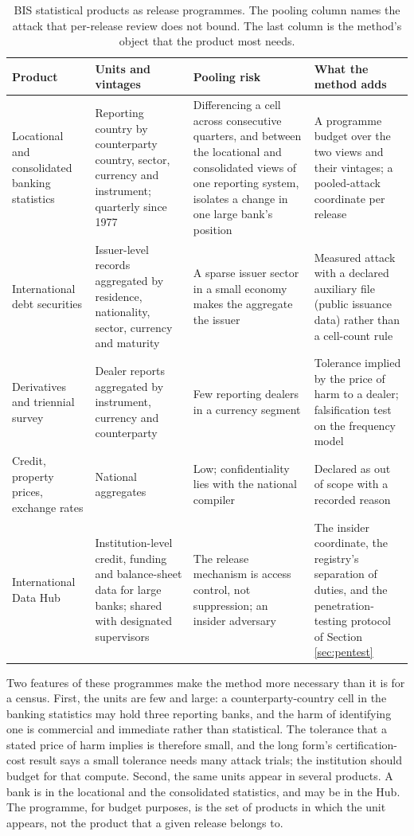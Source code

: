 \documentclass[11pt,a4paper]{article}
\begin{document}
\begin{table}[htbp]
\centering\small
\caption{BIS statistical products as release programmes. The pooling column names the attack that per-release review does not bound. The last column is the method's object that the product most needs.}
\label{tab:programmes}
\begin{tabular}{p{30mm}p{34mm}p{40mm}p{34mm}}
\toprule
Product & Units and vintages & Pooling risk & What the method adds \\
\midrule
Locational and consolidated banking statistics & Reporting country by counterparty country, sector, currency and instrument; quarterly since 1977 & Differencing a cell across consecutive quarters, and between the locational and consolidated views of one reporting system, isolates a change in one large bank's position & A programme budget over the two views and their vintages; a pooled-attack coordinate per release \\
International debt securities & Issuer-level records aggregated by residence, nationality, sector, currency and maturity & A sparse issuer sector in a small economy makes the aggregate the issuer & Measured attack with a declared auxiliary file (public issuance data) rather than a cell-count rule \\
Derivatives and triennial survey & Dealer reports aggregated by instrument, currency and counterparty & Few reporting dealers in a currency segment & Tolerance implied by the price of harm to a dealer; falsification test on the frequency model \\
Credit, property prices, exchange rates & National aggregates & Low; confidentiality lies with the national compiler & Declared as out of scope with a recorded reason \\
International Data Hub & Institution-level credit, funding and balance-sheet data for large banks; shared with designated supervisors & The release mechanism is access control, not suppression; an insider adversary & The insider coordinate, the registry's separation of duties, and the penetration-testing protocol of Section \ref{sec:pentest} \\
\bottomrule
\end{tabular}
\end{table}

Two features of these programmes make the method more necessary than it is for a census. First, the units are few and large: a counterparty-country cell in the banking statistics may hold three reporting banks, and the harm of identifying one is commercial and immediate rather than statistical. The tolerance that a stated price of harm implies is therefore small, and the long form's certification-cost result says a small tolerance needs many attack trials; the institution should budget for that compute. Second, the same units appear in several products. A bank is in the locational and the consolidated statistics, and may be in the Hub. The programme, for budget purposes, is the set of products in which the unit appears, not the product that a given release belongs to.
\end{document}
